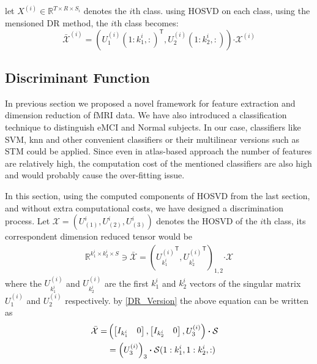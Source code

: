 \documentclass[journal]{IEEEtran}
\newcommand{\trans}{\mathsf{T}}
\begin{document}
	let $X^{(i)} \in \mathbb{R}^{T \times R \times S_i}$ denotes the $i$th class. using HOSVD on each class, using the mensioned DR method, the $i$th class becomes: 
	\[
	\bar{\mathcal{X}}^{(i)} = \left(
	U_{1}^{(i)}(1:k_1^i, :)^{\trans}, U_{2}^{(i)}(1:k_2^i, :)
	\right) \boldsymbol{\cdot} \mathcal{X}^{(i)}
	\]
	
	\subsection{Discriminant Function}
	In  previous section we proposed a novel framework for feature extraction and dimension reduction of fMRI data. We have also introduced a classification technique to distinguish eMCI and Normal subjects. In our case, classifiers like SVM, knn and other convenient classifiers or their multilinear versions such as STM could be applied.
	Since even in atlas-based approach the number of features are relatively high, the computation cost of the mentioned classifiers are also high and would probably cause the over-fitting issue. 
	
	In this section, using the computed components of HOSVD from the last section, and without extra computational costs, we have designed a discrimination process. 
	Let $\mathcal{X} = \left( U_{(1)}^{i},U_{(2)}^{i},U_{(3)}^{i} \right)$ denotes the HOSVD of the $i$th class, its correspondent dimension reduced tensor would be 
	\begin{align}
	\mathbb{R}^{k_1^i \times k_2^i \times S} \ni  \bar{{\mathcal{X}}} = \left( 
	{U_{k_1^i}^{(i)}}^{\trans}, {U_{k^i_2}^{(i)}}^{\trans} 
	\right)_{1,2}\boldsymbol{\cdot} \mathcal{X} \label{DR_Version}
	\end{align}
	where the $U_{k_1^i}^{(i)}$ and $U_{k_2^i}^{(i)}$ are the first $k_1^i$ and $k_2^i$ vectors of the singular matrix $U_1^{(i)}$ and $U_2^{(i)}$ respectively. by \eqref{DR_Version} the above equation can be written as 
	\begin{align}
	\bar{\mathcal{X}}= & \notag
	\left(
	\begin{bmatrix}
	I_{k_1^i} &  0
	\end{bmatrix},
	\begin{bmatrix}
	I_{k_2^i} &  0
	\end{bmatrix},
	U_3^{(i)}
	\right)\boldsymbol{\cdot} \mathcal{S} \notag
	\\&=\left( 
	U_{3}^{{(i)}}
	\right)_{3} \boldsymbol{\cdot} \mathcal{S}(1:k_1^i, 1:k_2^i, :) \notag &
	\end{align}
	
\end{document}
